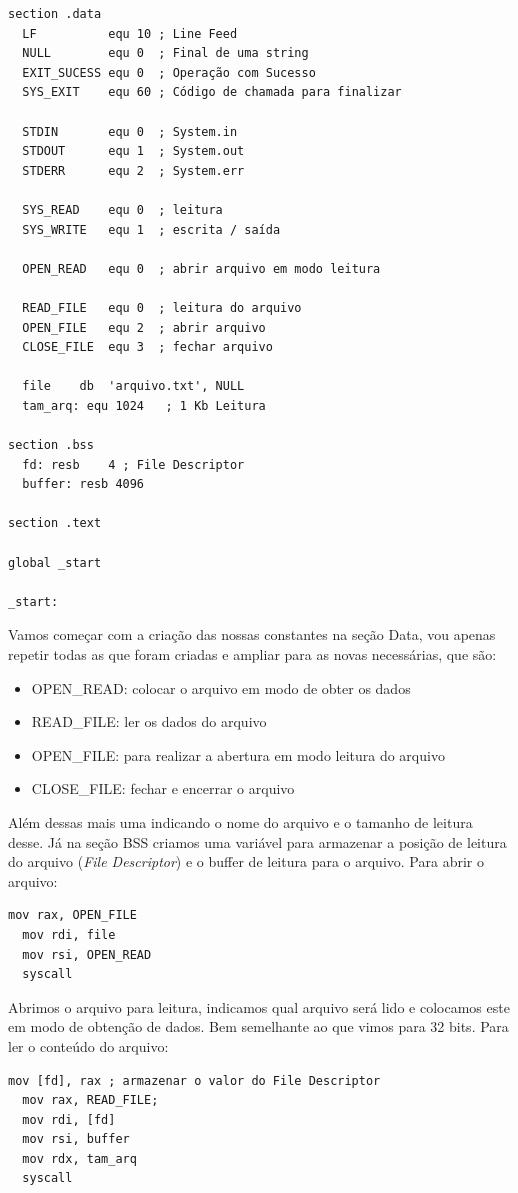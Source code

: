 \begin{lstlisting}[]
section .data
  LF          equ 10 ; Line Feed
  NULL        equ 0  ; Final de uma string
  EXIT_SUCESS equ 0  ; Operação com Sucesso
  SYS_EXIT    equ 60 ; Código de chamada para finalizar

  STDIN       equ 0  ; System.in
  STDOUT      equ 1  ; System.out
  STDERR      equ 2  ; System.err

  SYS_READ    equ 0  ; leitura
  SYS_WRITE   equ 1  ; escrita / saída

  OPEN_READ   equ 0  ; abrir arquivo em modo leitura

  READ_FILE   equ 0  ; leitura do arquivo
  OPEN_FILE   equ 2  ; abrir arquivo
  CLOSE_FILE  equ 3  ; fechar arquivo

  file    db  'arquivo.txt', NULL
  tam_arq: equ 1024   ; 1 Kb Leitura

section .bss
  fd: resb    4 ; File Descriptor
  buffer: resb 4096    

section .text

global _start

_start:
\end{lstlisting}

Vamos começar com a criação das nossas constantes na seção Data, vou apenas repetir todas as que foram criadas e ampliar para as novas necessárias, que são:
\begin{itemize}
\item OPEN\_READ: colocar o arquivo em modo de obter os dados
\item READ\_FILE: ler os dados do arquivo
\item OPEN\_FILE: para realizar a abertura em modo leitura do arquivo
\item CLOSE\_FILE: fechar e encerrar o arquivo
\end{itemize}

Além dessas mais uma indicando o nome do arquivo e o tamanho de leitura desse. Já na seção BSS criamos uma variável para armazenar a posição de leitura do arquivo (\textit{File Descriptor}) e o buffer de leitura para o arquivo. Para abrir o arquivo:
\begin{lstlisting}[]
  mov rax, OPEN_FILE
  mov rdi, file
  mov rsi, OPEN_READ
  syscall
\end{lstlisting}

Abrimos o arquivo para leitura, indicamos qual arquivo será lido e colocamos este em modo de obtenção de dados. Bem semelhante ao que vimos para 32 bits. Para ler o conteúdo do arquivo:
\begin{lstlisting}[]
  mov [fd], rax ; armazenar o valor do File Descriptor
  mov rax, READ_FILE;
  mov rdi, [fd]
  mov rsi, buffer
  mov rdx, tam_arq
  syscall
\end{lstlisting}

